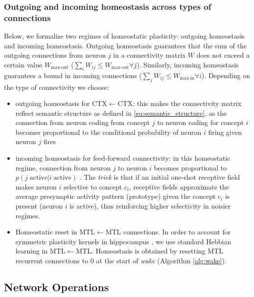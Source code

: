 \documentclass{article}
\begin{document}
\subsubsection*{Outgoing and incoming homeostasis across types of connections}
Below, we formalize two regimes of homeostatic plasticity: outgoing homeostasis and incoming homeostasis. Outgoing homeostasis guarantees that the sum of the outgoing connections from neuron $j$ in a connectivity matrix $W$ does not exceed a certain value $W_\textrm{max-out}$ ($\sum_iW_{ij} \leq W_\textrm{max-out} \forall j$). Similarly, incoming homeostasis guarantees a bound in incoming connections ($\sum_jW_{ij} \leq W_\textrm{max-in} \forall i$). Depending on the type of connectivity we choose:
\begin{itemize}
    \item outgoing homeostasis for CTX$\leftarrow$CTX: this makes the connectivity matrix reflect semantic structure as defined in \eqref{eq:semantic_structure}, as the connection from neuron coding from concept $j$ to neuron coding for concept $i$ becomes proportional to the conditional probability of neuron $i$ firing given neuron $j$ fires 
    \item incoming homeostasis for feed-forward connectivity: in this homeostatic regime, connection from neuron $j$ to neuron $i$ becomes proportional to $p(j \; \textrm{active} | i\; \textrm{active})$ . The \textit{trick} is that if an initial one-shot receptive field makes neuron $i$ selective to concept $c_i$, receptive fields approximate the average presynaptic activity pattern (prototype) given the concept $c_i$ is present (neuron $i$ is active), thus reinforcing higher selectivity in noisier regimes.
    \item Homeostatic reset in MTL$\leftarrow$MTL connections. In order to account for symmetric plasticity kernels in hippocampus , we use standard Hebbian learning in MTL$\leftarrow$MTL. Homeostasis is obtained by resetting MTL recurrent connections to 0 at the start of \textit{wake} (Algorithm \ref{alg:wake}).
\end{itemize}
\subsection*{Network Operations}
\end{document}
